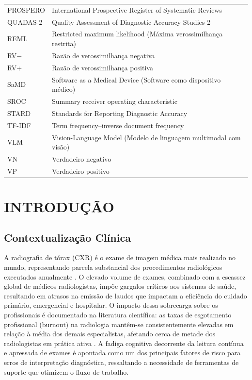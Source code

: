 \documentclass[12pt,a4paper]{article}
\begin{document}
\begin{singlespace}
\begin{tabular}{lp{12cm}}
PROSPERO & International Prospective Register of Systematic Reviews \\
QUADAS-2 & Quality Assessment of Diagnostic Accuracy Studies 2 \\
REML & Restricted maximum likelihood (Máxima verossimilhança restrita) \\
RV$-$ & Razão de verossimilhança negativa \\
RV+ & Razão de verossimilhança positiva \\
SaMD & Software as a Medical Device (Software como dispositivo médico) \\
SROC & Summary receiver operating characteristic \\
STARD & Standards for Reporting Diagnostic Accuracy \\
TF-IDF & Term frequency--inverse document frequency \\
VLM & Vision-Language Model (Modelo de linguagem multimodal com visão) \\
VN & Verdadeiro negativo \\
VP & Verdadeiro positivo \\
\end{tabular}
\end{singlespace}

\newpage
\pagestyle{fancy}

\section{INTRODUÇÃO}

\subsection{Contextualização Clínica}
A radiografia de tórax (CXR) é o exame de imagem médica mais realizado no mundo, representando parcela substancial dos procedimentos radiológicos executados anualmente \cite{vanginneken}. O elevado volume de exames, combinado com a escassez global de médicos radiologistas, impõe gargalos críticos aos sistemas de saúde, resultando em atrasos na emissão de laudos que impactam a eficiência do cuidado primário, emergencial e hospitalar. O impacto dessa sobrecarga sobre os profissionais é documentado na literatura científica: as taxas de esgotamento profissional (burnout) na radiologia mantêm-se consistentemente elevadas em relação à média dos demais especialistas, afetando cerca de metade dos radiologistas em prática ativa \cite{parikh}. A fadiga cognitiva decorrente da leitura contínua e apressada de exames é apontada como um dos principais fatores de risco para erros de interpretação diagnóstica, ressaltando a necessidade de ferramentas de suporte que otimizem o fluxo de trabalho.
\end{document}
